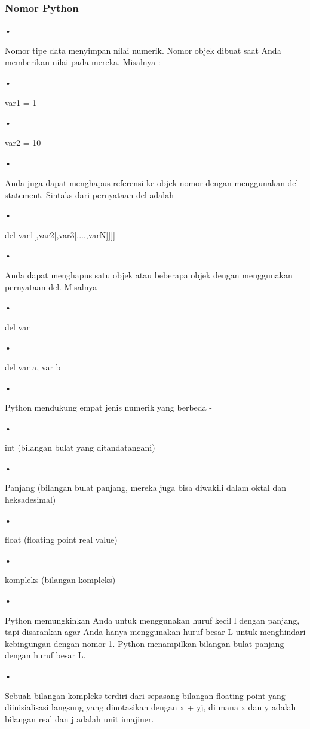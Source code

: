 \documentclass{wileySix}
\begin{document}
\subsubsection{Nomor Python}
\begin{flushleft}
•
\end{flushleft}Nomor tipe data menyimpan nilai numerik. Nomor objek dibuat saat Anda memberikan nilai pada mereka. Misalnya : \begin{flushleft}
•
\end{flushleft}var1 = 1
\begin{flushleft}
•
\end{flushleft}var2 = 10
\begin{flushleft}
•
\end{flushleft}Anda juga dapat menghapus referensi ke objek nomor dengan menggunakan del statement. Sintaks dari pernyataan del adalah -
\begin{flushleft}
•
\end{flushleft}del var1[,var2[,var3[....,varN]]]]
\begin{flushleft}
•
\end{flushleft}Anda dapat menghapus satu objek atau beberapa objek dengan menggunakan pernyataan del. Misalnya -
\begin{flushleft}
•
\end{flushleft}del var
\begin{flushleft}
•
\end{flushleft}del var a, var b
\begin{flushleft}
•
\end{flushleft}Python mendukung empat jenis numerik yang berbeda -
\begin{flushleft}
•
\end{flushleft}int (bilangan bulat yang ditandatangani)
\begin{flushleft}
•
\end{flushleft}Panjang (bilangan bulat panjang, mereka juga bisa diwakili dalam oktal dan heksadesimal)
\begin{flushleft}
•
\end{flushleft}float (floating point real value)
\begin{flushleft}
•
\end{flushleft}kompleks (bilangan kompleks)
\begin{flushleft}
•
\end{flushleft}Python memungkinkan Anda untuk menggunakan huruf kecil l dengan panjang, tapi disarankan agar Anda hanya menggunakan huruf besar L untuk menghindari kebingungan dengan nomor 1. Python menampilkan bilangan bulat panjang dengan huruf besar L.
\begin{flushleft}
•
\end{flushleft}Sebuah bilangan kompleks terdiri dari sepasang bilangan floating-point yang diinisialisasi langsung yang dinotasikan dengan x + yj, di mana x dan y adalah bilangan real dan j adalah unit imajiner.
\end{document}
